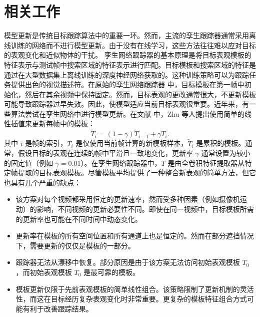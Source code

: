 \section{相关工作}
模型更新是传统目标跟踪算法中的重要一环。然而，主流的孪生跟踪器通常采用离线训练的网络而不进行模型更新。由于没有在线学习，这些方法往往难以应对目标的表观变化和近似物体的干扰。
孪生网络跟踪器的基本原理是将目标表观模板的特征表示与测试帧中搜索区域的特征表示进行匹配。目标模板和搜索区域的特征是通过在大型数据集上离线训练的深度神经网络获取的。这种训练策略可以为跟踪任务提供出色的视觉描述符。在原始的孪生网络跟踪器 \cite{SiamFC} 中，目标模板在第一帧中初始化，然后在其余视频中保持固定。然而，目标表观的更改通常很大，不更新模板可能导致跟踪器过早失效。因此，使模型适应当前目标表观很重要。近年来，有一些算法尝试在孪生网络中进行模型更新。在文献 \cite{zhu2018distractor} 中，Zhu 等人提出使用简单的线性插值来更新每帧中的模板：
\begin{equation}
\widetilde{T}_{i}=(1-\gamma) \widetilde{T}_{i-1}+\gamma T_{i}.
\end{equation}
其中 $i$ 是帧的索引，$T_{i}$ 是仅使用当前帧计算的新模板样本，$\widetilde{T}_{i}$ 是累积的模板。通常，假设目标的表观在连续的帧中平滑且一致地变化，更新率 $\gamma$ 通常设置为较小的固定值（例如 $\gamma = 0.01$）。在孪生网络跟踪器中，$T$ 是由全卷积特征提取器从特定帧提取的目标表观模板。尽管模板平均提供了一种整合新表观的简单方法，但它也具有几个严重的缺点：

\begin{itemize}
\item 该方案对每个视频都采用恒定的更新速率，然而受多种因素（例如摄像机运动）的影响，不同视频的更新必要性不同。即使在同一视频中，目标模板所需的更新率也可能在不同时间中动态变化。
\item 更新率在模板的所有空间位置和所有通道上也是恒定的。然而在部分遮挡情况下，需要更新的仅仅是模板的一部分。
\item 跟踪器无法从漂移中恢复。部分原因是由于该方案无法访问初始表观模板 $T_{0}$，而初始表观模板 $T_{0}$ 是最可靠的模板。
\item 模板更新仅限于先前表观模板的简单线性组合。该策略限制了更新机制的灵活性，而这在目标经历复杂表观变化时非常重要。更复杂的模板特征组合方式可能有利于改善跟踪结果。
\end{itemize}

